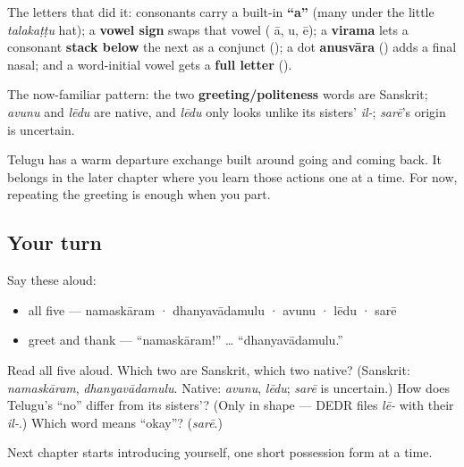 The letters that did it: consonants carry a built-in \textbf{\textquotedblleft{}a\textquotedblright{}} (many under the little \emph{talakaṭṭu} hat); a \textbf{vowel sign} swaps that vowel ( ā,  u,  ē); a \textbf{virama} lets a consonant \textbf{stack below} the next as a conjunct (); a dot \textbf{anusvāra} () adds a final nasal; and a word-initial vowel gets a \textbf{full letter} ().

The now-familiar pattern: the two \textbf{greeting/politeness} words are Sanskrit; \emph{avunu} and \emph{lēdu} are native, and \emph{lēdu} only looks unlike its sisters' \emph{il-}; \emph{sarē}'s origin is uncertain.

\begin{culture}
Telugu has a warm departure exchange built around going and coming back. It belongs in the later chapter where you learn those actions one at a time. For now, repeating the greeting is enough when you part.
\end{culture}

\subsection*{Your turn}
Say these aloud:

\begin{itemize}
\raggedright
  \item all five — namaskāram · dhanyavādamulu · avunu · lēdu · sarē
  \item greet and thank — \textquotedblleft{}namaskāram!\textquotedblright{} … \textquotedblleft{}dhanyavādamulu.\textquotedblright{}
\end{itemize}

\begin{tcolorbox}[breakable,colback=teal!4,colframe=teal!35!black,title={Before you move on}]
Read all five aloud. Which two are Sanskrit, which two native? (Sanskrit: \emph{namaskāram}, \emph{dhanyavādamulu}. Native: \emph{avunu}, \emph{lēdu}; \emph{sarē} is uncertain.) How does Telugu's \textquotedblleft{}no\textquotedblright{} differ from its sisters'? (Only in shape — DEDR files \emph{lē-} with their \emph{il-}.) Which word means \textquotedblleft{}okay\textquotedblright{}? (\emph{sarē}.)

Next chapter starts introducing yourself, one short possession form at a time.
\end{tcolorbox}
